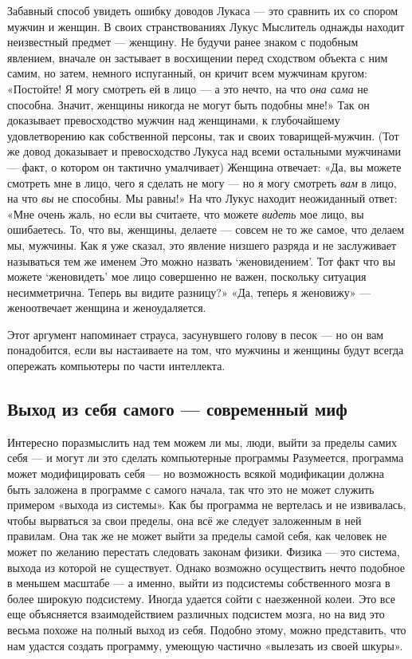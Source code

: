 \documentclass[../main.tex]{subfiles}
\begin{document}
Забавный способ увидеть ошибку доводов Лукаса --- это сравнить их со спором мужчин и женщин. В своих странствованиях Лукус Мыслитель однажды находит неизвестный предмет --- женщину. Не будучи ранее знаком с подобным явлением, вначале он застывает в восхищении перед сходством объекта с ним самим, но затем, немного испуганный, он кричит всем мужчинам кругом: «Постойте! Я могу смотреть ей в лицо --- а это нечто, на что \emph{она сама} не способна. Значит, женщины никогда не могут быть подобны мне!» Так он доказывает превосходство мужчин над женщинами, к глубочайшему удовлетворению как собственной персоны, так и своих товарищей-мужчин. (Тот же довод доказывает и превосходство Лукуса над всеми остальными мужчинами --- факт, о котором он тактично умалчивает) Женщина отвечает: «Да, вы можете смотреть мне в лицо, чего я сделать не могу --- но я могу смотреть \emph{вам} в лицо, на что \emph{вы} не способны. Мы равны!» На что Лукус находит неожиданный ответ: «Мне очень жаль, но если вы считаете, что можете \emph{видеть} мое лицо, вы ошибаетесь. То, что вы, женщины, делаете --- совсем не то же самое, что делаем мы, мужчины. Как я уже сказал, это явление низшего разряда и не заслуживает называться тем же именем Это можно назвать \enquote*{женовидением}. Тот факт что вы можете \enquote*{женовидеть} мое лицо совершенно не важен, поскольку ситуация несимметрична. Теперь вы видите разницу?» «Да, теперь я женовижу» --- женоотвечает женщина и женоудаляется.

Этот аргумент напоминает страуса, засунувшего голову в песок --- но он вам понадобится, если вы настаиваете на том, что мужчины и женщины будут всегда опережать компьютеры по части интеллекта.


\subsection{Выход из себя самого --- современный миф}

Интересно поразмыслить над тем можем ли мы, люди, выйти за пределы самих себя --- и могут ли это сделать компьютерные программы Разумеется, программа может модифицировать себя --- но возможность всякой модификации должна быть заложена в программе с самого начала, так что это не может служить примером «выхода из системы». Как бы программа не вертелась и не извивалась, чтобы вырваться за свои пределы, она всё же следует заложенным в ней правилам. Она так же не может выйти за пределы самой себя, как человек не может по желанию перестать следовать законам физики. Физика --- это система, выхода из которой не существует. Однако возможно осуществить нечто подобное в меньшем масштабе --- а именно, выйти из подсистемы собственного мозга в более широкую подсистему. Иногда удается сойти с наезженной колеи. Это все еще объясняется взаимодействием различных подсистем мозга, но на вид это весьма похоже на полный выход из себя. Подобно этому, можно представить, что нам удастся создать программу, умеющую частично «вылезать из своей шкуры».
\end{document}
